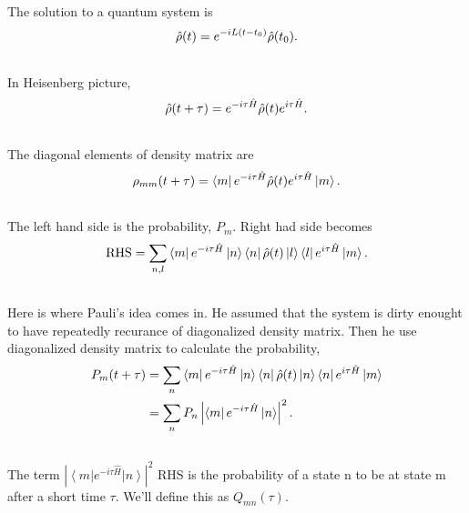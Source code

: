 \documentclass[letterpaper,10pt,english]{sphinxmanual}
\newcommand{\bra}[1]{\left\langle #1\right|}
\newcommand{\ket}[1]{\left| #1\right\rangle}
\begin{document}
The solution to a quantum system is
\begin{gather}
\begin{split}\hat \rho(t) = e^{-iL(t-t_0)} \hat \rho(t_0) .\end{split}\notag\\\begin{split}\end{split}\notag
\end{gather}
In Heisenberg picture,
\begin{gather}
\begin{split}\hat \rho(t+\tau) = e^{-i\tau \hat H} \hat \rho(t) e^{i\tau \hat H} .\end{split}\notag\\\begin{split}\end{split}\notag
\end{gather}
The diagonal elements of density matrix are
\begin{gather}
\begin{split}\rho_{mm}(t+\tau) = \bra{m}e^{-i\tau \hat H} \hat \rho(t) e^{i\tau \hat H} \ket{m}.\end{split}\notag\\\begin{split}\end{split}\notag
\end{gather}
The left hand side is the probability, $P_m$. Right had side becomes
\begin{gather}
\begin{split}\text{RHS} = \sum_{n,l}\bra{m}e^{-i\tau \hat H} \ket{n} \bra{n}\hat \rho(t) \ket{l}\bra{l} e^{i\tau \hat H} \ket{m}.\end{split}\notag\\\begin{split}\end{split}\notag
\end{gather}
Here is where Pauli's idea comes in. He assumed that the system is dirty enought to have repeatedly recurance of diagonalized density matrix. Then he use diagonalized density matrix to calculate the probability,
\begin{gather}
\begin{split}P_m(t+\tau) &= \sum_{n}\bra{m}e^{-i\tau \hat H} \ket{n} \bra{n}\hat \rho(t) \ket{n}\bra{n} e^{i\tau \hat H} \ket{m} \\
& = \sum_{n} P_n \left\vert \bra{m} e^{-i\tau \hat H} \ket{n}  \right\vert^2 .\end{split}\notag\\\begin{split}\end{split}\notag
\end{gather}
The term $\left\vert \bra{m} e^{-i\tau \hat H} \ket{n}  \right\vert^2$ RHS is the probability of a state n to be at state m after a short time $\tau$. We'll define this as $Q_{mn}(\tau)$.
\end{document}
